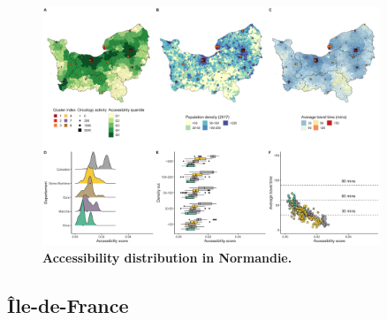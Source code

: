 \begin{figure}[H]
    \includegraphics[width=0.9\textwidth]{images/camion/region_accessibility/accessibility_Normandie.png}
    \centering
    \caption{
        \textbf{Accessibility distribution in Normandie.}
    }
\end{figure}

\subsection*{Île-de-France}

